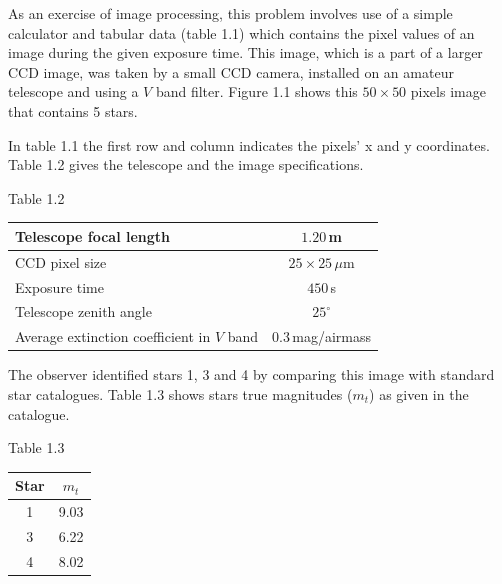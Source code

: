 As an exercise of image processing, this problem involves use of a simple
calculator and tabular data (table 1.1) which contains the pixel values of an
image during the given exposure time. This image, which is a part of a larger
CCD image, was taken by a small CCD camera, installed on an amateur telescope
and using a $V$ band filter. Figure 1.1 shows this $50 \times 50$ pixels
image that contains 5 stars.



In table 1.1 the first row and column indicates the pixels' x and y
coordinates. Table 1.2 gives the telescope and the image specifications.

\begin{center}
Table 1.2\\[2pt]
\begin{tabular}{|l|c|}
\hline
Telescope focal length & $1.20$\,m \\
\hline
CCD pixel size & $25 \times 25\,\mu$m \\
\hline
Exposure time & $450$\,s \\
\hline
Telescope zenith angle & $25^\circ$ \\
\hline
Average extinction coefficient in $V$ band & 0.3\,mag/airmass \\
\hline
\end{tabular}
\end{center}

The observer identified stars 1, 3 and 4 by comparing this image with
standard star catalogues. Table 1.3 shows stars true magnitudes ($m_t$) as
given in the catalogue.

\begin{center}
Table 1.3\\[2pt]
\begin{tabular}{|c|c|}
\hline
Star & $m_t$ \\
\hline
1 & 9.03 \\
\hline
3 & 6.22 \\
\hline
4 & 8.02 \\
\hline
\end{tabular}
\end{center}

